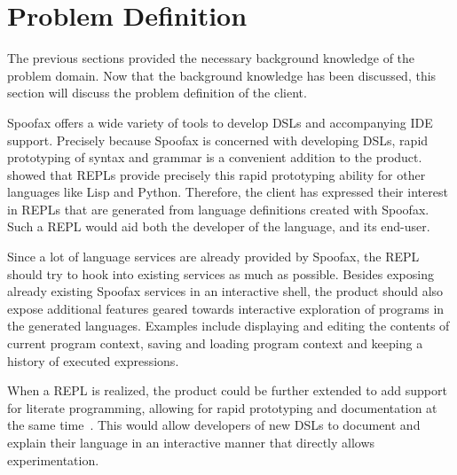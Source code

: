 \section{Problem Definition}
\label{sec:problem-definition}

The previous sections provided the necessary background knowledge of
the problem domain. Now that the background knowledge has been
discussed, this section will discuss the problem definition of the
client.

Spoofax offers a wide variety of tools to develop DSLs and
accompanying IDE support. Precisely because Spoofax is concerned with
developing DSLs, rapid prototyping of syntax and grammar is a
convenient addition to the product.  showed
that REPLs provide precisely this rapid prototyping ability for other
languages like Lisp and Python. Therefore, the client has expressed
their interest in REPLs that are generated from language definitions
created with Spoofax. Such a REPL would aid both the developer of the
language, and its end-user.

Since a lot of language services are already provided by Spoofax, the
REPL should try to hook into existing services as much as possible.
Besides exposing already existing Spoofax services in an interactive
shell, the product should also expose additional features geared
towards interactive exploration of programs in the generated
languages.  Examples include displaying and editing the contents of
current program context, saving and loading program context and
keeping a history of executed expressions.

When a REPL is realized, the product could be further extended to add
support for literate programming, allowing for rapid prototyping and
documentation at the same time~\cite{schulte2012}. This would allow
developers of new DSLs to document and explain their language in an
interactive manner that directly allows experimentation.

